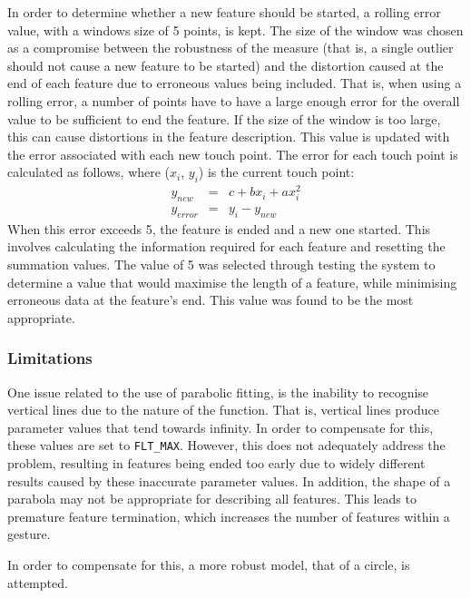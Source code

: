 In order to determine whether a new feature should be started, a rolling error value, with a windows size of 5 points, is kept. The size of the window was chosen as a compromise between the robustness of the measure (that is, a single outlier should not cause a new feature to be started) and the distortion caused at the end of each feature due to erroneous values being included. That is, when using a rolling error, a number of points have to have a large enough error for the overall value to be sufficient to end the feature. If the size of the window is too large, this can cause distortions in the feature description. This value is updated with the error associated with each new touch point. The error for each touch point is calculated as follows, where ($x_i$, $y_i$) is the current touch point:
\begin{eqnarray*}
	y_{new} & = & c + bx_{i} + ax_{i}^2 \\
	y_{error} & = & y_{i} - y_{new}
\end{eqnarray*}
When this error exceeds 5, the feature is ended and a new one started. This involves calculating the information required for each feature and resetting the summation values. The value of 5 was selected through testing the system to determine a value that would maximise the length of a feature, while minimising erroneous data at the feature's end. This value was found to be the most appropriate.

\subsubsection{Limitations}
One issue related to the use of parabolic fitting, is the inability to recognise vertical lines due to the nature of the function. That is, vertical lines produce parameter values that tend towards infinity. In order to compensate for this, these values are set to \texttt{FLT\_MAX}. However, this does not adequately address the problem, resulting in features being ended too early due to widely different results caused by these inaccurate parameter values. In addition, the shape of a parabola may not be appropriate for describing all features. This leads to premature feature termination, which increases the number of features within a gesture. 

In order to compensate for this, a more robust model, that of a circle, is attempted.

